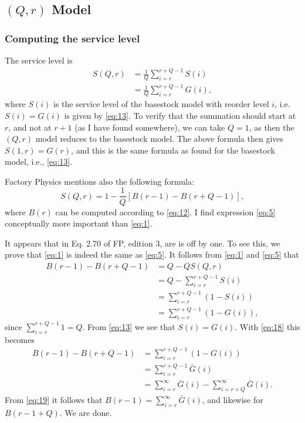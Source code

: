 
\subsection{$(Q,r)$ Model}

\subsubsection{Computing the service level}

The service level is
\begin{equation}
  \label{eq:5}
  \begin{split}
   S(Q,r) 
   &= \frac1Q \sum_{i=r}^{r+Q-1} S(i) \\
   &= \frac1Q \sum_{i=r}^{r+Q-1} G(i),
  \end{split}
\end{equation}
where $S(i)$ is the service level of the basestock model with reorder
level $i$, i.e. $S(i)=G(i)$ is given by \eqref{eq:13}.  To verify that
the summation should start at $r$, and not at $r+1$ (as I have found
somewhere), we can take $Q=1$, as then the $(Q,r)$ model reduces to
the basestock model. The above formula then gives $S(1,r)= G(r)$, and
this is the same formula as found for the basestock model, i.e.,
\eqref{eq:13}.


Factory Physics mentions also the following formula:
\begin{equation}
  \label{eq:1}
   S(Q,r) = 1- \frac1Q [B(r-1) - B(r+Q-1)],
\end{equation}
where $B(r)$ can be computed according to \eqref{eq:12}.  I find
expression \eqref{eq:5} conceptually more important than \eqref{eq:1}. 

\begin{remark}
  
It
appears that in Eq. 2.70 of FP, edition 3, are is off by one. To see
this, we prove that \eqref{eq:1} is indeed the same as \eqref{eq:5}. It
follows from \eqref{eq:1} and \eqref{eq:5} that
\begin{equation*}
  \begin{split}
   B(r-1) - B(r+Q-1) 
   &= Q - Q S(Q,r) \\
   &= Q - \sum_{i=r}^{r+Q-1} S(i) \\
   &= \sum_{i=r}^{r+Q-1}(1- S(i)) \\
   &= \sum_{i=r}^{r+Q-1}(1- G(i)),
  \end{split}
\end{equation*}
since $\sum_{i=r}^{r+Q-1} 1 = Q$. From \eqref{eq:13} we see that $S(i)
= G(i)$. With \eqref{eq:18} this becomes
\begin{equation*}
  \begin{split}
    B(r-1) - B(r+Q-1)
    &= \sum_{i=r}^{r+Q-1}(1- G(i))\\
    &= \sum_{i=r}^{r+Q-1} \bar G(i)\\
    &= \sum_{i=r}^{\infty} \bar G(i) -\sum_{i=r+Q}^\infty \bar G(i).
  \end{split}
\end{equation*}
From \eqref{eq:19} it follows that $B(r-1)=\sum_{i=r}^{\infty} \bar
G(i)$, and likewise for $B(r-1+Q)$. We are done.
\end{remark}


